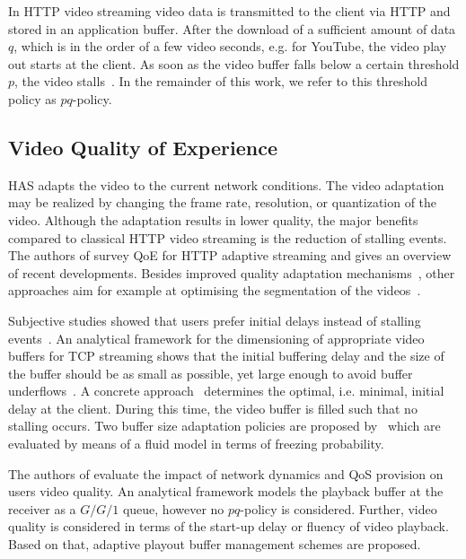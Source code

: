 In \gls{HTTP} video streaming video data is transmitted to the client via \gls{HTTP} and stored in an application buffer.
After the download of a sufficient amount of data \(q\), which is in the order of a few video seconds, e.g. for YouTube, the video play out starts at the client.
As soon as the video buffer falls below a certain threshold \(p\), the video stalls~\cite{Hossfeld2013c}.
In the remainder of this work, we refer to this threshold policy as \(pq\)-policy.

\subsection{Video Quality of Experience}\label{sec:application:background:application_qoe}
\gls{HAS} adapts the video to the current network conditions.
The video adaptation may be realized by changing the frame rate, resolution, or quantization of the video. Although the adaptation results in lower quality, the major benefits compared to classical \gls{HTTP} video streaming is the reduction of stalling events.
The authors of \cite{Seufert2014} survey \gls{QoE} for \gls{HTTP} adaptive streaming and gives an overview of recent developments. 
Besides improved quality adaptation mechanisms~\cite{Sieber2013}, other approaches aim for example at optimising the segmentation of the videos~\cite{Lievens2013}.

Subjective studies showed that users prefer initial delays instead of stalling events~\cite{Hossfeld2012c}.
An analytical framework for the dimensioning of appropriate video buffers for \gls{TCP} streaming shows that the initial buffering delay and the size of the buffer should be as small as possible, yet large enough to avoid buffer underflows~\cite{Yan2011}. 
A concrete approach~\cite{Hossfeld2012b} determines the optimal, i.e. minimal, initial delay at the client.
During this time, the video buffer is filled such that no stalling occurs.
Two buffer size adaptation policies are proposed by~\cite{Fiedler2014} which are evaluated by means of a fluid model in terms of freezing probability. 

The authors of \cite{Luan2010} evaluate the impact of network dynamics and \gls{QoS} provision on users video quality. 
An analytical framework models the playback buffer at the receiver as a \(G/G/1\) queue, however no \(pq\)-policy is considered. 
Further, video quality is considered in terms of the start-up delay or fluency of video playback. 
Based on that, adaptive playout buffer management schemes are proposed. 

